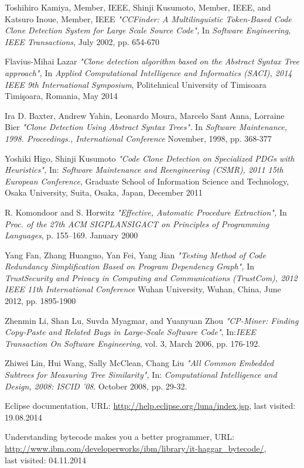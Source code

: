 \documentclass{report}
\begin{document}
\begin{thebibliography}{100}
 Toshihiro Kamiya, Member, IEEE, Shinji Kusumoto, Member, IEEE, and Katsuro Inoue, Member, IEEE \emph{"CCFinder: A Multilinguistic Token-Based Code Clone Detection System for Large Scale Source Code",} In \emph{Software Engineering, IEEE Transactions},  July 2002, pp. 654-670

 Flavius-Mihai Lazar \emph{"Clone detection algorithm based on the Abstract Syntax Tree approach",} In \emph{Applied Computational Intelligence and Informatics (SACI), 2014 IEEE 9th International Symposium}, Politehnical University of Timisoara Timişoara, Romania, May 2014

 Ira D. Baxter, Andrew Yahin, Leonardo Moura, Marcelo Sant Anna, Lorraine Bier \emph{"Clone Detection Using Abstract Syntax Trees".} In \emph{Software Maintenance, 1998. Proceedings., International Conference} November, 1998, pp. 368-377

 Yoshiki Higo, Shinji Kusumoto \emph{"Code Clone Detection on Specialized PDGs with Heuristics",} In: \emph{Software Maintenance and Reengineering (CSMR), 2011 15th European Conference}, Graduate School of Information Science and Technology, Osaka University, Suita, Osaka, Japan, December 2011

 R. Komondoor and S. Horwitz \emph{"Effective, Automatic Procedure Extraction",} In \emph{Proc. of the 27th ACM SIGPLANSIGACT
on Principles of Programming Languages}, p. 155–169. January 2000

 Yang Fan, Zhang Huanguo, Yan Fei, Yang Jian \emph{"Testing Method of Code Redundancy Simplification Based on Program Dependency Graph", } 
In \emph{ TrustSecurity and Privacy in Computing and Communications (TrustCom), 2012 IEEE 11th International Conference }
Wuhan University, Wuhan, China, June 2012, pp. 1895-1900 

 Zhenmin Li, Shan Lu, Suvda Myagmar, and Yuanyuan Zhou \emph{"CP-Miner: Finding Copy-Paste and
Related Bugs in Large-Scale Software Code"}, In:\emph{IEEE Transaction On Software Engineering}, vol. 3, March 2006, pp. 176-192.

 Zhiwei Lin, Hui Wang, Sally McClean, Chang Liu \emph{"All Common Embedded Subtrees for Measuring Tree Similarity",} In:
\emph{Computational Intelligence and Design, 2008: ISCID '08}. October 2008, pp. 29-32.

 Eclipse documentation, URL: \url{http://help.eclipse.org/luna/index.jsp}, last visited: 19.08.2014

 Understanding bytecode makes you a better programmer, URL: \url{http://www.ibm.com/developerworks/ibm/library/it-haggar_bytecode/},\\ last visited: 04.11.2014

\end{thebibliography} 
\end{document}
